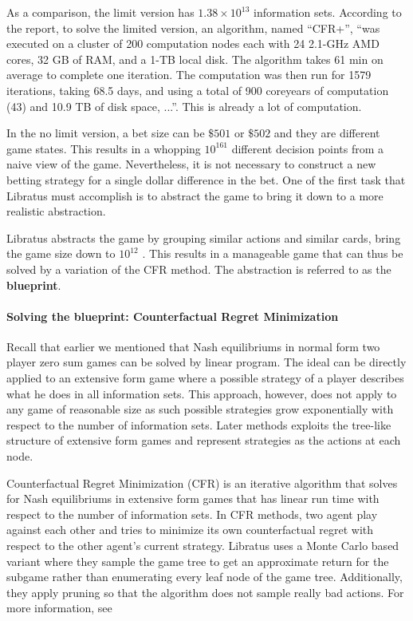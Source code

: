 \documentclass[10pt,a4paper]{article}
\begin{document}
As a comparison, the limit version has $1.38 \times 10^{13}$ information sets. According to the report, to solve the limited version, an algorithm, named ``CFR+'', ``was executed on a cluster of 200 computation nodes each with 24 2.1-GHz AMD cores, 32 GB of RAM, and a 1-TB local disk. The algorithm takes 61 min on average to complete one iteration. The computation was then run for 1579 iterations, taking 68.5 days, and using a total of 900 coreyears of computation (43) and 10.9 TB of disk space, ...''. This is already a lot of computation.

In the no limit version, a bet size can be $\$ 501$ or $\$ 502$ and they are different game states. This results in a whopping $10^161$ different decision points from a naive view of the game. Nevertheless, it is not necessary to construct a new betting strategy for a single dollar difference  in the bet. One of the first task that Libratus must accomplish is to abstract the game to bring it down to a more realistic abstraction.

Libratus abstracts the game by grouping similar actions and similar cards, bring the game size down to $10^{12}$ \cite{brown2017superhuman}. This results in a manageable game that can thus be solved by a variation of the CFR method. The abstraction is referred to as the \textbf{blueprint}.

\paragraph{Solving the blueprint: Counterfactual Regret Minimization}
Recall that earlier we mentioned that Nash equilibriums in normal form two player zero sum games can be solved by linear program. The ideal can be directly applied to an extensive form game where a possible strategy of a player describes what he does in all information sets. This approach, however, does not apply to any game of reasonable size as such possible strategies grow exponentially with respect to the number of information sets. Later methods exploits the tree-like structure of extensive form games and represent strategies as the actions at each node.

Counterfactual Regret Minimization (CFR) is an iterative algorithm that solves for Nash equilibriums in extensive form games that has linear run time with respect to the number of information sets. In CFR methods, two agent play against each other and tries to minimize its own counterfactual regret with respect to the other agent's current strategy. Libratus uses a Monte Carlo based variant where they sample the game tree to get an approximate return for the subgame rather than enumerating every leaf node of the game tree. Additionally, they apply pruning so that the algorithm does not sample really bad actions. For more information, see~\cite{zinkevich2008regret, johanson2012efficient}
\end{document}
